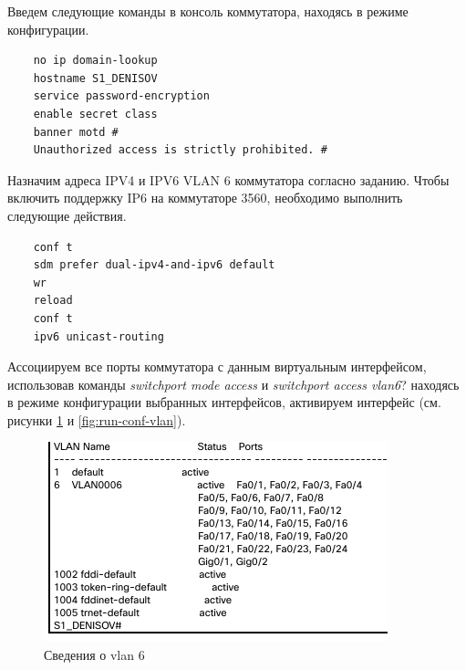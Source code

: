 \documentclass[a4paper,14pt]{extarticle}
\begin{document}


{
Введем следующие команды в консоль коммутатора, находясь в режиме конфигурации. 

\begin{lstlisting}
	no ip domain-lookup
	hostname S1_DENISOV
	service password-encryption
	enable secret class
	banner motd #
	Unauthorized access is strictly prohibited. #
\end{lstlisting}
}

Назначим адреса IPV4 и IPV6 VLAN 6 коммутатора согласно заданию. Чтобы включить поддержку IP6 на коммутаторе 3560, необходимо выполнить следующие действия. 

\begin{lstlisting}
	conf t
	sdm prefer dual-ipv4-and-ipv6 default
	wr
	reload
	conf t
	ipv6 unicast-routing
\end{lstlisting}

Ассоциируем все порты коммутатора с данным виртуальным интерфейсом, использовав команды \textit{switchport mode access} и \textit{switchport access vlan6}? находясь в режиме конфигурации выбранных интерфейсов, активируем интерфейс (см. рисунки \ref{fig:vlan-brief} и \ref{fig:run-conf-vlan}).

\begin{figure}[h!]
	\centering
	\includegraphics[width=0.6\linewidth]{images/vlan-brief}
	\caption{Сведения о vlan 6 }
	\label{fig:vlan-brief}
\end{figure}
\end{document}
